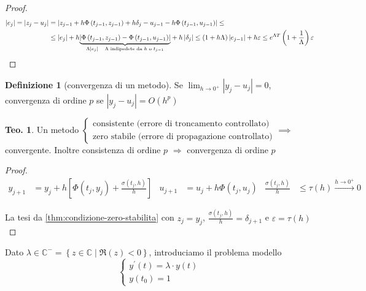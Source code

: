 \documentclass[a4paper,10pt]{article}
\theoremstyle{definition}
\theoremstyle{indentdefinition}
\newtheorem{defn}{Definizione}[section]
\theoremstyle{indenttheorem}
\newtheorem{thm}{Teo.}
\theoremstyle{myremark}
\theoremstyle{indentgeneral}
\theoremstyle{plain}
\theoremstyle{plain}
\newenvironment{myboxed} 
{\noindent\begin{lrbox}{\mybox}\begin{minipage}{\textwidth}}
{\end{minipage}\end{lrbox}\fbox{\usebox{\mybox}}}
\begin{document}
\begin{proof}
\begin{align*}
\left|e_{j}\right|=\left|z_{j}-u_{j}\right| & =\left|z_{j-1}+h\Phi\left(t_{j-1},z_{j-1}\right)+h\delta_{j}-u_{j-1}-h\Phi\left(t_{j-1},u_{j-1}\right)\right|\leq\\
 & \leq\left|e_{j}\right|+h\underset{\Lambda\left|e_{j}\right|\quad\text{\ensuremath{\Lambda} indipedete da \ensuremath{h} o \ensuremath{t_{j-1}}}}{\underbrace{\left|\Phi\left(t_{j-1},z_{j-1}\right)-\Phi\left(t_{j-1},u_{j-1}\right)\right|}}+h\left|\delta_{j}\right|\leq\left(1+h\Lambda\right)\left|e_{j-1}\right|+h\varepsilon\leq e^{\Lambda T}\left(1+\frac{1}{\Lambda}\right)\varepsilon
\end{align*}
\end{proof}
\begin{defn}[convergenza di un metodo]
Se $\lim_{h\rightarrow0^{+}}\left|y_{j}-u_{j}\right|=0$, convergenza
di ordine $p$ se $\left|y_{j}-u_{j}\right|=O\left(h^{p}\right)$
\end{defn}

\begin{myboxed}
\begin{thm}
Un metodo $\begin{cases}
    \text{consistente (errore di troncamento controllato)}\\
    \text{zero stabile (errore di propagazione controllato)}
\end{cases}\implies$ convergente.
Inoltre consistenza di ordine $p$ $\Longrightarrow$ convergenza
di ordine $p$
\end{thm}
\end{myboxed}

\begin{proof}
\begin{align*}
y_{j+1} & =y_{j}+h\left[\Phi\left(t_{j},y_{j}\right)+\frac{\sigma\left(t_{j},h\right)}{h}\right] & u_{j+1} & =u_{j}+h\Phi\left(t_{j},u_{j}\right) & \frac{\sigma\left(t_{j},h\right)}{h} & \leq\tau\left(h\right)\overset{h\rightarrow0^{+}}{\longrightarrow}0
\end{align*}

La tesi da \eqref{thm:condizione-zero-stabilita} con $z_{j}=y_{j}$,
$\frac{\sigma\left(t_{j},h\right)}{h}=\delta_{j+1}$ e $\varepsilon=\tau\left(h\right)$
\end{proof}
Dato $\lambda\in\mathbb{C}^{-}=\left\{ z\in\mathbb{C}\mid\Re\left(z\right)<0\right\} $,
introduciamo il problema modello
\[
\begin{cases}
y^{\prime}\left(t\right)=\lambda\cdot y\left(t\right)\\
y\left(t_{0}\right)=1
\end{cases}
\]
\end{document}
